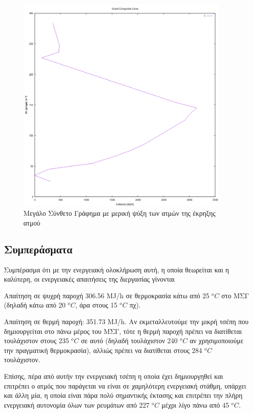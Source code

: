 \documentclass[11pt]{article}
\begin{document}
\begin{figure}[htbp]
\centering
\includegraphics[width=400px]{Diagrams/grand_composite_curve_3.png}
\caption{Μεγάλο Σύνθετο Γράφημα με μερική ψύξη των ατμών της έκρηξης ατμού}
\end{figure}

\pagebreak

\subsection{Συμπεράσματα}
\label{sec:orgae4c49e}
Συμπέρασμα ότι με την ενεργειακή ολοκλήρωση αυτή, η οποία θεωρείται και η καλύτερη, οι ενεργειακές απαιτήσεις της διεργασίας γίνονται

Απαίτηση σε ψυχρή παροχή 306.56 MJ/h σε θερμοκρασία κάτω από 25 \(^oC\) στο ΜΣΓ (δηλαδή κάτω από 20 \(^oC\), άρα στους 15 \(^oC\) πχ).

Απαίτηση σε θερμή παροχή: 351.73 MJ/h. Αν εκμεταλλευτούμε την μικρή τσέπη που δημιουργείται στο πάνω μέρος του ΜΣΓ, τότε η θερμή παροχή πρέπει να διατίθεται τουλάχιστον στους 235 \(^oC\) σε αυτό (δηλαδή τουλάχιστον 240 \(^oC\) αν χρησιμοποιούμε την πραγματική θερμοκρασία), αλλιώς πρέπει να διατίθεται στους 284 \(^oC\) τουλάχιστον. 

Επίσης, πέρα από αυτήν την ενεργειακή τσέπη η οποία έχει δημιουργηθεί και επιτρέπει ο ατμός που παράγεται να είναι σε χαμηλότερη ενεργειακή στάθμη, υπάρχει και άλλη μία, η οποία είναι πάρα πολύ σημαντικής έκτασης και επιτρέπει την πλήρη ενεργειακή αυτονομία όλων των ρευμάτων από 227 \(^oC\) μέχρι λίγο πάνω από 45 \(^oC\).
\end{document}
